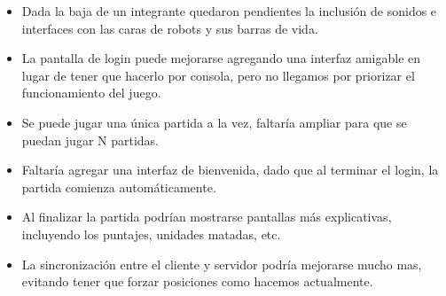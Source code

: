\begin{itemize}
    \item Dada la baja de un integrante quedaron pendientes la inclusión de
    sonidos e interfaces con las caras de robots y sus barras de vida.
    \item La pantalla de login puede mejorarse agregando una interfaz amigable
    en lugar de tener que hacerlo por consola, pero no llegamos por priorizar
    el funcionamiento del juego.
    \item Se puede jugar una única partida a la vez, faltaría ampliar para que
    se puedan jugar N partidas.
    \item Faltaría agregar una interfaz de bienvenida, dado que al terminar el
    login, la partida comienza automáticamente.
    \item Al finalizar la partida podrían mostrarse pantallas más explicativas,
    incluyendo los puntajes, unidades matadas, etc.
    \item La sincronización entre el cliente y servidor podría mejorarse mucho
    mas, evitando tener que forzar posiciones como hacemos actualmente.
\end{itemize}